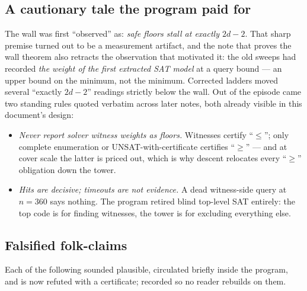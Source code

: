 \documentclass[11pt]{article}
\theoremstyle{plain}
\theoremstyle{definition}
\theoremstyle{remark}
\begin{document}
\subsection{A cautionary tale the program paid for}

The wall was first ``observed'' as: \emph{safe floors stall at exactly
$2d - 2$}. That sharp premise turned out to be a measurement artifact,
and the note that proves the wall theorem also retracts the observation
that motivated it: the old sweeps had recorded \emph{the weight of the
first extracted SAT model} at a query bound --- an upper bound on the
minimum, not the minimum. Corrected ladders moved several ``exactly
$2d-2$'' readings strictly below the wall. Out of the episode came two
standing rules quoted verbatim across later notes, both already visible
in this document's design:

\begin{itemize}[leftmargin=2em]
\item \emph{Never report solver witness weights as floors.} Witnesses
  certify ``$\leq$''; only complete enumeration or UNSAT-with-certificate
  certifies ``$\geq$'' --- and at cover scale the latter is priced out,
  which is why descent relocates every ``$\geq$'' obligation down the
  tower.
\item \emph{Hits are decisive; timeouts are not evidence.} A dead
  witness-side query at $n = 360$ says nothing. The program retired
  blind top-level SAT entirely: the top code is for finding witnesses,
  the tower is for excluding everything else.
\end{itemize}

\subsection{Falsified folk-claims}

Each of the following sounded plausible, circulated briefly inside the
program, and is now refuted with a certificate; recorded so no reader
rebuilds on them.
\end{document}
